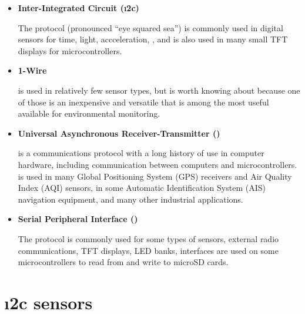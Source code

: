 \begin{itemize}
	\item \textbf{Inter-Integrated Circuit (\i2c)}

	The  protocol (pronounced ``eye squared sea'') is commonly used in digital sensors for time, light, accceleration, \etc, and is also used in many small TFT displays for microcontrollers.

	\item \textbf{1-Wire}

	  is used in relatively few sensor types, but is worth knowing about because one of those is an inexpensive and versatile  that is among the most useful available for environmental monitoring.


	\item \textbf{Universal Asynchronous Receiver-Transmitter (\uart)}

	 is a communications protocol with a long history of use in computer hardware, including communication between computers and microcontrollers.
	\uart is used in many Global Positioning System (GPS) receivers and Air Quality Index (AQI) sensors, in some Automatic Identification System (AIS) navigation equipment, and many other industrial applications.

	\item \textbf{Serial Peripheral Interface (\spi)}

	The  protocol is commonly used for some types of sensors, external radio communications, TFT displays, LED banks, \etc \spi interfaces are used on some microcontrollers to read from and write to microSD cards.
\end{itemize}



\section{\color{gray}\i2c sensors \color{black}}
